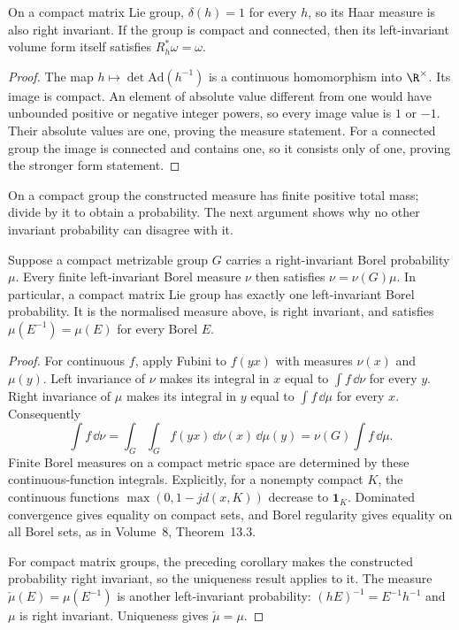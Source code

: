 \begin{corollary}\label{cor:compactunimodular}
On a compact matrix Lie group, $\delta(h)=1$ for every $h$, so its Haar
measure is also right invariant. If the group is compact and connected,
then its left-invariant volume form itself satisfies $R_h^*\omega=\omega$.
\end{corollary}
\begin{proof}
The map $h\mapsto\det\mathrm{Ad}(h^{-1})$ is a continuous homomorphism
into $\R^\times$. Its image is compact. An element of absolute value
different from one would have unbounded positive or negative integer
powers, so every image value is $1$ or $-1$.
Their absolute values are one, proving the measure statement.
For a connected group the image is connected and contains one, so it
consists only of one, proving the stronger form statement.
\end{proof}

On a compact group the constructed measure has finite positive total
mass; divide by it to obtain a probability. The next argument shows why
no other invariant probability can disagree with it.

\begin{theorem}[uniqueness]\label{thm:haarcompact}
Suppose a compact metrizable group $G$ carries a right-invariant Borel
probability $\mu$. Every finite left-invariant Borel measure $\nu$ then
satisfies $\nu=\nu(G)\mu$.
In particular, a compact matrix Lie group has exactly one left-invariant
Borel probability. It is the normalised measure above, is right invariant,
and satisfies $\mu(E^{-1})=\mu(E)$ for every Borel $E$.
\end{theorem}
\begin{proof}
For continuous $f$, apply Fubini to $f(yx)$ with measures $\nu(x)$ and
$\mu(y)$. Left invariance of $\nu$ makes its integral in $x$ equal to
$\int f\,\dd\nu$ for every $y$. Right invariance of $\mu$ makes its
integral in $y$ equal to $\int f\,\dd\mu$ for every $x$.
Consequently
\[
 \int f\,\dd\nu
 =\int_G\int_Gf(yx)\,\dd\nu(x)\,\dd\mu(y)
 =\nu(G)\int f\,\dd\mu.
\]
Finite Borel measures on a compact metric space are determined by these
continuous-function integrals. Explicitly, for a nonempty compact $K$, the continuous
functions $\max(0,1-jd(x,K))$ decrease to $\mathbf1_K$.
Dominated convergence gives equality on compact sets, and Borel regularity
gives equality on all Borel sets, as in Volume~8, Theorem~13.3.

For compact matrix groups, the preceding corollary makes the constructed
probability right invariant, so the uniqueness result applies to it.
The measure $\check\mu(E)=\mu(E^{-1})$ is another left-invariant
probability: $(hE)^{-1}=E^{-1}h^{-1}$ and $\mu$ is right invariant.
Uniqueness gives $\check\mu=\mu$.
\end{proof}

